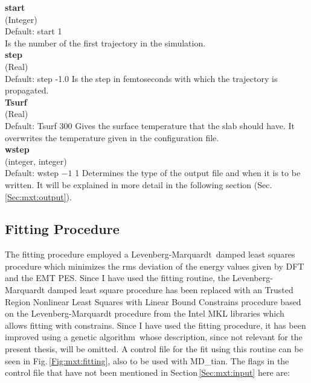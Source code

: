 \documentclass[twoside, 11pt, titlepage, captions=nooneline, a4paper, headsepline]{scrbook}%
\newcommand{\9}{\mathrm}
\newcommand{\0}{\,\mathrm}
\begin{document}
\noindent\textbf{start}\\ 
(Integer)\\
Default: start 1\\
Is the number of the first trajectory in the simulation.\\

\noindent\textbf{step}\\ 
(Real)\\
Default: step -1.0
Is the step in femtoseconds with which the trajectory is propagated.\\

\noindent\textbf{Tsurf}\\ 
(Real)\\ 
Default: Tsurf 300
Gives the surface temperature that the slab should have. It overwrites the temperature given in the configuration file.\\

\noindent\textbf{wstep}\\
(integer, integer)\\ 
Default: wstep $-1$ 1
Determines the type of the output file and when it is to be written. It will be explained in more detail in the following section (Sec.\,\ref{Sec:mxt:output}).\\


\subsection{Fitting Procedure}
\label{sec:mxt:control:fit}
The fitting procedure employed a Levenberg-Marquardt\,\cite{Levenberg1944,Marquardt1963} damped least squares procedure which minimizes the rms deviation of the energy values given by DFT and the EMT PES. Since I have used the fitting routine, the Levenberg-Marquardt damped least square procedure has been replaced with an Trusted Region Nonlinear Least Squares with Linear Bound Constrains procedure based on the Levenberg-Marquardt procedure from the Intel MKL libraries which allows fitting with constrains. Since I have used the fitting procedure, it has been improved using a genetic algorithm\,\cite{marvinmaster,marvinpc} whose description, since not relevant for the present thesis, will be omitted. A control file for the fit using this routine can be seen in Fig.\,\ref{Fig:mxt:fitting}, also to be used with MD\_tian. The flags in the control file that have not been mentioned in Section\,\ref{Sec:mxt:input} here are:\\
\end{document}
